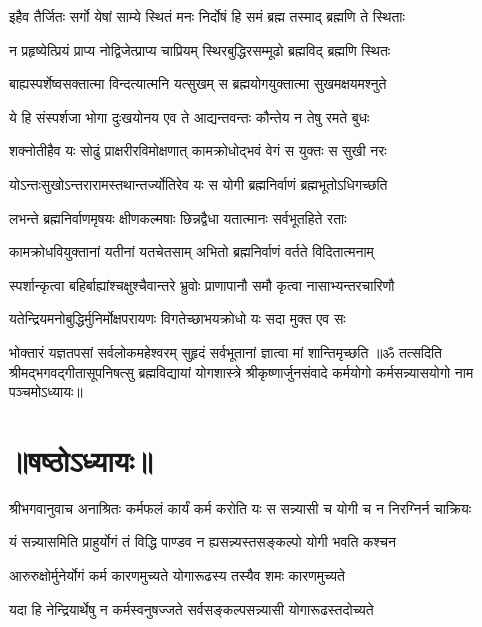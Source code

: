 \twolineshloka
{इहैव तैर्जितः सर्गो येषां साम्ये स्थितं मनः}
{निर्दोषं हि समं ब्रह्म तस्माद् ब्रह्मणि ते स्थिताः}%

\twolineshloka
{न प्रहृष्येत्प्रियं प्राप्य नोद्विजेत्प्राप्य चाप्रियम्}
{स्थिरबुद्धिरसम्मूढो ब्रह्मविद् ब्रह्मणि स्थितः}%

\twolineshloka
{बाह्यस्पर्शेष्वसक्तात्मा विन्दत्यात्मनि यत्सुखम्}
{स ब्रह्मयोगयुक्तात्मा सुखमक्षयमश्नुते}%

\twolineshloka
{ये हि संस्पर्शजा भोगा दुःखयोनय एव ते}
{आद्यन्तवन्तः कौन्तेय न तेषु रमते बुधः}%

\twolineshloka
{शक्नोतीहैव यः सोढुं प्राक्षरीरविमोक्षणात्}
{कामक्रोधोद्भवं वेगं स युक्तः स सुखी नरः}%

\twolineshloka
{योऽन्तःसुखोऽन्तरारामस्तथान्तर्ज्योतिरेव यः}
{स योगी ब्रह्मनिर्वाणं ब्रह्मभूतोऽधिगच्छति}%

\twolineshloka
{लभन्ते ब्रह्मनिर्वाणमृषयः क्षीणकल्मषाः}
{छिन्नद्वैधा यतात्मानः सर्वभूतहिते रताः}%

\twolineshloka
{कामक्रोधवियुक्तानां यतीनां यतचेतसाम्}
{अभितो ब्रह्मनिर्वाणं वर्तते विदितात्मनाम्}%

\twolineshloka
{स्पर्शान्कृत्वा बहिर्बाह्यांश्चक्षुश्चैवान्तरे भ्रुवोः}
{प्राणापानौ समौ कृत्वा नासाभ्यन्तरचारिणौ}%

\twolineshloka
{यतेन्द्रियमनोबुद्धिर्मुनिर्मोक्षपरायणः}
{विगतेच्छाभयक्रोधो यः सदा मुक्त एव सः}%

\twolineshloka
{भोक्तारं यज्ञतपसां सर्वलोकमहेश्वरम्}
{सुहृदं सर्वभूतानां ज्ञात्वा मां शान्तिमृच्छति}%
{॥ॐ तत्सदिति श्रीमद्भगवद्गीतासूपनिषत्सु ब्रह्मविद्यायां योगशास्त्रे श्रीकृष्णार्जुनसंवादे कर्मयोगो कर्मसन्न्यासयोगो नाम पञ्चमोऽध्यायः॥}

\section{॥षष्ठोऽध्यायः॥}
{श्रीभगवानुवाच}
\twolineshloka
{अनाश्रितः कर्मफलं कार्यं कर्म करोति यः}
{स सन्न्यासी च योगी च न निरग्निर्न चाक्रियः}%

\twolineshloka
{यं सन्न्यासमिति प्राहुर्योगं तं विद्धि पाण्डव}
{न ह्यसन्न्यस्तसङ्कल्पो योगी भवति कश्चन}%

\twolineshloka
{आरुरुक्षोर्मुनेर्योगं कर्म कारणमुच्यते}
{योगारूढस्य तस्यैव शमः कारणमुच्यते}%

\twolineshloka
{यदा हि नेन्द्रियार्थेषु न कर्मस्वनुषज्जते}
{सर्वसङ्कल्पसन्न्यासी योगारूढस्तदोच्यते}%

